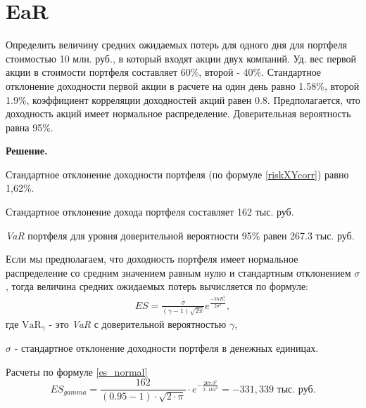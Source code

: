 \documentclass[12pt,a4paper]{article}
\begin{document}
\section{EaR}
\begin{taskrus} 
Определить величину средних ожидаемых потерь для одного дня для портфеля стоимостью 10 млн. руб., в который входят акции двух компаний. Уд. вес первой акции в стоимости портфеля составляет 60\%, второй - 40\%. Стандартное отклонение доходности первой акции в расчете на один день равно 1.58\%, второй 1.9\%, коэффициент корреляции доходностей акций равен 0.8. Предполагается, что доходность акций имеет нормальное распределение. Доверительная вероятность равна 95\%.

\textbf{Решение.}

Стандартное отклонение доходности портфеля (по формуле \eqref{riskXYcorr}) равно 1,62\%.

Стандартное отклонение дохода портфеля составляет 162 тыс. руб.

\textit{VaR} портфеля для уровня доверительной вероятности 95\% равен 267.3 тыс. руб.

Если мы предполагаем, что доходность портфеля имеет нормальное распределение со средним значением равным нулю и стандартным отклонением $\sigma$, тогда величина средних ожидаемых потерь вычисляется по формуле:
\begin{align}
\label{es_normal}
ES=\frac{\sigma}{(\gamma-1)\sqrt{2\pi}}e^{\frac{-VaR_{\gamma}^2}{2\sigma^2}},
\end{align}
где 
$\mbox{VaR}_{\gamma}$ - это \textit{VaR} с доверительной вероятностью $\gamma$,

$\sigma$ - стандартное отклонение доходности портфеля в денежных единицах.

Расчеты по формуле \eqref{es_normal} 
$$ES_{gamma}=\frac{162}{(0.95-1)\cdot \sqrt{2 \cdot \pi}}\cdot e^{-\frac{267.3^2}{2 \cdot 162^2}}=-331,339 \text{ тыс. руб.}$$



\end{taskrus}
\end{document}
